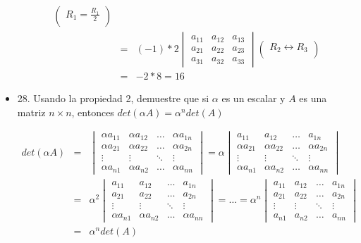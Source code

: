\documentclass[12pt]{article}
\theoremstyle{plain}
\theoremstyle{definition}
\begin{document}
\begin{itemize}
\begin{eqnarray*}
        \begin{pmatrix}
          R_1=\frac{R_1}{2}\\ 
         \end{pmatrix}\\
          &=&(-1)*2\begin{vmatrix}
          a_{11} & a_{12} & a_{13}\\
          a_{21} & a_{22} & a_{23}\\
          a_{31} & a_{32} & a_{33}
        \end{vmatrix}
        \begin{pmatrix}
          R_2\leftrightarrow R_3\\ 
         \end{pmatrix}\\
         &=&-2*8=16
        \end{eqnarray*}
    \item 28. Usando la propiedad 2, demuestre que si $\alpha$ es un escalar y $A$ es una matriz $n\times n$, entonces $det(\alpha A)=\alpha^n det(A)$ 
    
    \begin{eqnarray*}
    det(\alpha A)&=&
        \begin{vmatrix}
          \alpha a_{11} & \alpha a_{12} & \dots & \alpha a_{1n}\\
          \alpha a_{21} & \alpha a_{22} & \dots &\alpha a_{2n}\\
          \vdots & \vdots & \ddots & \vdots\\
          \alpha a_{n1} & \alpha a_{n2} & \dots &\alpha a_{nn}
        \end{vmatrix}
        =\alpha\begin{vmatrix}
           a_{11} &  a_{12} & \dots &  a_{1n}\\
          \alpha a_{21} & \alpha a_{22} & \dots &\alpha a_{2n}\\
          \vdots & \vdots & \ddots & \vdots\\
          \alpha a_{n1} & \alpha a_{n2} & \dots &\alpha a_{nn}
        \end{vmatrix}\\
        &=&\alpha^2\begin{vmatrix}
           a_{11} &  a_{12} & \dots & a_{1n}\\
          a_{21} &  a_{22} & \dots & a_{2n}\\
          \vdots & \vdots & \ddots & \vdots\\
          \alpha a_{n1} & \alpha a_{n2} & \dots &\alpha a_{nn}
          \end{vmatrix}=\dots
          =\alpha^n\begin{vmatrix}
           a_{11} &  a_{12} & \dots & a_{1n}\\
          a_{21} &  a_{22} & \dots & a_{2n}\\
          \vdots & \vdots & \ddots & \vdots\\
           a_{n1} &  a_{n2} & \dots & a_{nn}
          \end{vmatrix}\\
          &=&\alpha^n det(A)
        \end{eqnarray*}
    

\end{itemize}
\end{document}
